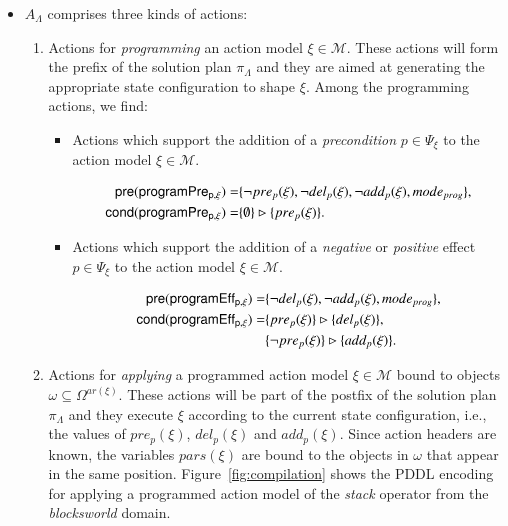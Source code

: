 \begin{itemize}
\item $A_{\Lambda}$ comprises three kinds of actions:
\begin{enumerate}
\item Actions for {\em programming} an action model $\xi\in\mathcal{M}$. These actions will form the prefix of the solution plan $\pi_\Lambda$ and they are aimed at generating the appropriate state configuration to shape $\xi$. Among the programming actions, we find:
\begin{itemize}
\item Actions which support the addition of a {\em precondition} $p\in \Psi_{\xi}$ to the action model $\xi\in\mathcal{M}$.

\begin{small}
\begin{align*}
\hspace*{7pt}\mathsf{pre}(\mathsf{programPre_{p,\xi}})=&\{\neg pre_{p}(\xi), \neg del_{p}(\xi),\neg add_{p}(\xi), mode_{prog}\},\\
\mathsf{cond}(\mathsf{programPre_{p,\xi}})=&\{\emptyset\}\rhd\{pre_{p}(\xi)\}.
\end{align*}
\end{small}

\item Actions which support the addition of a {\em negative} or {\em positive} effect $p\in \Psi_{\xi}$ to the action model $\xi\in\mathcal{M}$.

\begin{small}
\begin{align*}
\hspace*{7pt}\mathsf{pre}(\mathsf{programEff_{p,\xi}})=&\{\neg del_{p}(\xi),\neg add_{p}(\xi), mode_{prog}\},\\
\mathsf{cond}(\mathsf{programEff_{p,\xi}})=&\{pre_{p}(\xi)\}\rhd\{del_{p}(\xi)\},\\
& \{\neg pre_{p}(\xi)\}\rhd\{add_{p}(\xi)\}.
\end{align*}
\end{small}
\end{itemize}

\item Actions for {\em applying} a programmed action model $\xi\in\mathcal{M}$ bound to objects $\omega\subseteq\Omega^{ar(\xi)}$. These actions will be part of the postfix of the solution plan $\pi_\Lambda$ and they execute $\xi$ according to the current state configuration, i.e., the values of $pre_p(\xi)$, $del_p(\xi)$ and $add_p(\xi)$. Since action headers are known, the variables $pars(\xi)$ are bound to the objects in $\omega$ that appear in the same position. Figure~\ref{fig:compilation} shows the PDDL encoding for applying a programmed action model of the {\em stack} operator from the {\em blocksworld} domain.



\end{enumerate}
\end{itemize}
